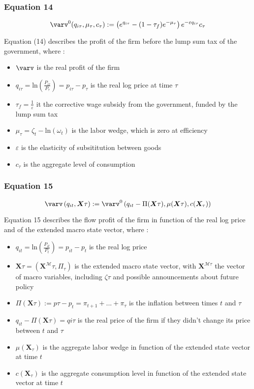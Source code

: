 \documentclass{article}
\begin{document}
\subsubsection*{Equation 14}
\begin{equation}
    \varv^{0}(q_{i\tau},\mu_{\tau},c_{\tau}):=\left(e^{q_{i\tau}}-(1-\tau_{f})e^{-\mu_{\tau}}\right)e^{-\varepsilon q_{i\tau}}c_{\tau}
\end{equation}

Equation (14) describes the profit of the firm before the lump sum tax of the government, where : 
\begin{itemize}
    \item $\varv$ is the real profit of the firm
    \item $q_{i\tau}=\text{ln}\left(\frac{P_{i\tau}}{P_{\tau}}\right)=p_{i\tau}-p_{\tau}$ is the real log price at time $\tau$
    \item $\tau_f=\frac{1}{\varepsilon}$ it the corrective wage subsidy from the government, funded by the lump sum tax
    \item $\mu_{\tau}=\zeta_{t}-\text{ln}(\omega_{t})$ is the labor wedge, which is zero at efficiency
    \item $\varepsilon$ is the elasticity of subsititution between goods
    \item $c_{\tau}$ is the aggregate level of consumption
\end{itemize}

\subsubsection*{Equation 15}
\begin{equation}
    \varv\left(q_{it},\bm{X}{\tau}\right):=\varv^{0}\left(q_{it}-\Pi(\bm{X}{\tau}),\mu(\bm{X}{\tau}),c(\bm{X}_{\tau})\right)
\end{equation}

Equation 15 describes the flow profit of the firm in function of the real log price and of the extended macro state vector, where : 
\begin{itemize}
    \item $q_{it}=\text{ln}\left(\frac{P_{it}}{P_{t}}\right)=p_{it}-p_{t}$ is the real log price
    \item $\bm{X}{\tau}=(\bm{X}^{\mathcal{M}}{\tau}, \Pi_{\tau})$ is the extended macro state vector, with $\bm{X}^{\mathcal{M}{\tau}}$ the vector of macro variables, including $\zeta{\tau}$ and possible announcements about future policy
    \item $\Pi\left(\bm{X}{\tau}\right):=p{\tau}-p_{t}=\pi_{t+1}+...+\pi_{\tau}$ is the inflation between times $t$ and $\tau$
    \item $q_{it}-\Pi(\bm{X}{\tau})=q{i\tau}$ is the real price of the firm if they didn't change its price between $t$ and $\tau$
    \item $\mu\left(\bm{X}_{\tau}\right)$ is the aggregate labor wedge in function of the extended state vector at time $t$
    \item $c(\bm{X}_{\tau})$ is the aggregate consumption level in function of the extended state vector at time $t$
\end{itemize}
\end{document}
